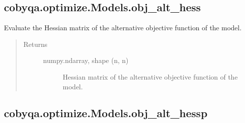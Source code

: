 \documentclass[letterpaper,10pt,english]{sphinxmanual}
\begin{document}
\begin{fulllineitems}
\begin{fulllineitems}
\begin{quote}
\begin{description}
\begin{description}
\end{description}

\end{description}\end{quote}

\end{fulllineitems}



\subsection{cobyqa.optimize.Models.obj\_alt\_hess}
\label{\detokenize{refs/generated/cobyqa.optimize.Models.obj_alt_hess:cobyqa-optimize-models-obj-alt-hess}}\label{\detokenize{refs/generated/cobyqa.optimize.Models.obj_alt_hess::doc}}

\begin{fulllineitems}
\label{\detokenize{refs/generated/cobyqa.optimize.Models.obj_alt_hess:cobyqa.optimize.Models.obj_alt_hess}}
\sphinxAtStartPar
Evaluate the Hessian matrix of the alternative objective function of the
model.
\begin{quote}\begin{description}
\item[{Returns}] \leavevmode\begin{description}
\item[{numpy.ndarray, shape (n, n)}] \leavevmode
\sphinxAtStartPar
Hessian matrix of the alternative objective function of the model.

\end{description}

\end{description}\end{quote}

\end{fulllineitems}



\subsection{cobyqa.optimize.Models.obj\_alt\_hessp}
\label{\detokenize{refs/generated/cobyqa.optimize.Models.obj_alt_hessp:cobyqa-optimize-models-obj-alt-hessp}}\label{\detokenize{refs/generated/cobyqa.optimize.Models.obj_alt_hessp::doc}}


\end{fulllineitems}
\end{document}
